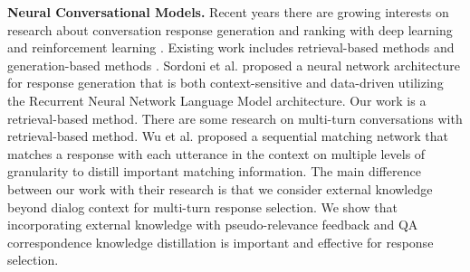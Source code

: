 \textbf{Neural Conversational Models.}
Recent years there are growing interests on research about conversation response generation and ranking with deep learning and reinforcement learning \cite{DBLP:conf/acl/ShangLL15,DBLP:conf/sigir/YanSW16,DBLP:conf/cikm/YanSZW16,DBLP:conf/sigir/YanZE17,DBLP:conf/acl/LiGBSGD16,DBLP:conf/emnlp/LiMRJGG16,DBLP:conf/naacl/SordoniGABJMNGD15,bordes2017learning}. Existing work includes retrieval-based methods \cite{DBLP:conf/acl/WuWXZL17,DBLP:conf/emnlp/ZhouDWZYTLY16,DBLP:conf/sigir/YanSW16,DBLP:conf/sigir/YanZE17,DBLP:journals/corr/JiLL14,DBLP:journals/corr/LowePSP15} and generation-based methods \cite{DBLP:conf/acl/ShangLL15,DBLP:conf/acl/TianYMSFZ17,DBLP:conf/emnlp/RitterCD11,DBLP:conf/naacl/SordoniGABJMNGD15,DBLP:journals/corr/VinyalsL15,DBLP:conf/emnlp/LiMRJGG16,bordes2017learning,P17-1045,alime-chat}. Sordoni et al. \cite{DBLP:conf/naacl/SordoniGABJMNGD15} proposed a neural network architecture for response generation that is both context-sensitive and data-driven utilizing the Recurrent Neural Network Language Model architecture. %
 Our work is a retrieval-based method. There are some research on multi-turn conversations with retrieval-based method. Wu et al. \cite{DBLP:conf/acl/WuWXZL17} proposed a sequential matching network that matches a response with each utterance in the context on multiple levels of granularity to distill important matching information. The main difference between our work with their research is that we consider external knowledge beyond dialog context for multi-turn response selection. We show that incorporating external knowledge with pseudo-relevance feedback and QA correspondence knowledge distillation is important and effective for response selection.


